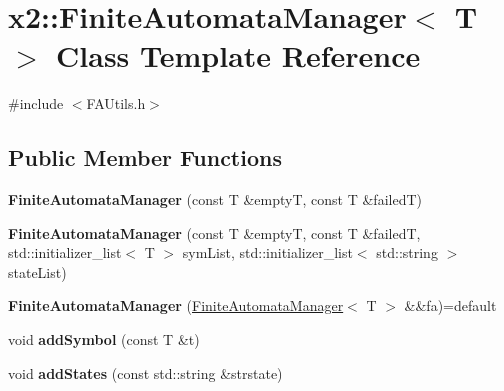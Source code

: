 \hypertarget{classx2_1_1_finite_automata_manager}{}\section{x2\+:\+:Finite\+Automata\+Manager$<$ T $>$ Class Template Reference}
\label{classx2_1_1_finite_automata_manager}


{\ttfamily \#include $<$F\+A\+Utils.\+h$>$}

\subsection*{Public Member Functions}
\begin{DoxyCompactItemize}
\item 
\mbox{\label{classx2_1_1_finite_automata_manager_a13a355f1b81eba02742ee65c777ea291}} 
{\bfseries Finite\+Automata\+Manager} (const T \&emptyT, const T \&failedT)
\item 
\mbox{\label{classx2_1_1_finite_automata_manager_af7c092cddeb6a5e9a5f4179054edded0}} 
{\bfseries Finite\+Automata\+Manager} (const T \&emptyT, const T \&failedT, std\+::initializer\+\_\+list$<$ T $>$ sym\+List, std\+::initializer\+\_\+list$<$ std\+::string $>$ state\+List)
\item 
\mbox{\label{classx2_1_1_finite_automata_manager_a731643ed9332c61379350bbb4656b119}} 
{\bfseries Finite\+Automata\+Manager} (\hyperlink{classx2_1_1_finite_automata_manager}{Finite\+Automata\+Manager}$<$ T $>$ \&\&fa)=default
\item 
\mbox{\label{classx2_1_1_finite_automata_manager_a98b4a7376b062fb688a46ed4d444d39d}} 
void {\bfseries add\+Symbol} (const T \&t)
\item 
\mbox{\label{classx2_1_1_finite_automata_manager_aa9a9eb2979c9e0eb5b855ddbcc275d6e}} 
void {\bfseries add\+States} (const std\+::string \&strstate)
\item 
\mbox{\label{classx2_1_1_finite_automata_manager_aa8d09bb88a278d4faadfe8b1e95a0ff2}} 

\end{DoxyCompactItemize}
